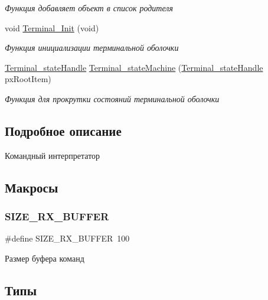\begin{DoxyCompactItemize}
\begin{DoxyCompactList}\small\item\em Функция добавляет объект в список родителя \end{DoxyCompactList}\item 
void \mbox{\hyperlink{group__terminal_gacc9b80fa13f248f795d961b1817b7d4b}{Terminal\+\_\+\+Init}} (void)
\begin{DoxyCompactList}\small\item\em Функция инициализации терминальной оболочки \end{DoxyCompactList}\item 
\mbox{\hyperlink{group__terminal_gadcd4acb437149111c071e40bccbac72a}{Terminal\+\_\+state\+Handle}} \mbox{\hyperlink{group__terminal_ga7a0e27324a74d61713c05ec981b8d5ed}{Terminal\+\_\+state\+Machine}} (\mbox{\hyperlink{group__terminal_gadcd4acb437149111c071e40bccbac72a}{Terminal\+\_\+state\+Handle}} px\+Root\+Item)
\begin{DoxyCompactList}\small\item\em Функция для прокрутки состояний терминальной оболочки \end{DoxyCompactList}\end{DoxyCompactItemize}


\subsection{Подробное описание}
Командный интерпретатор 



\subsection{Макросы}
\mbox{\label{group__terminal_gab480fdc4b952fd3ce8109b25dd19ce05}} 
\subsubsection{\texorpdfstring{SIZE\_RX\_BUFFER}{SIZE\_RX\_BUFFER}}
{\footnotesize\ttfamily \#define S\+I\+Z\+E\+\_\+\+R\+X\+\_\+\+B\+U\+F\+F\+ER~100}



Размер буфера команд 



\subsection{Типы}
\mbox{\label{group__terminal_gadcd4acb437149111c071e40bccbac72a}} 
